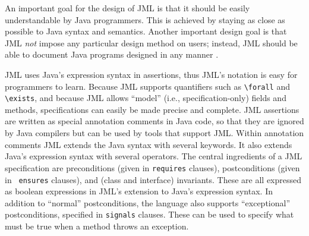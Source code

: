 An important goal for the design of JML is that it should be easily
understandable by Java programmers. This is achieved by staying as
close as possible to Java syntax and semantics.  Another important
design goal is that JML {\em not} impose any particular design method
on users; instead, JML should be able to document Java programs
designed in any manner \cite{Leavens-Baker-Ruby03}.

JML uses Java's expression syntax in assertions,
thus JML's notation is easy for programmers to learn.  
Because JML supports quantifiers such as
\verb_\forall_ and \verb_\exists_, and because JML allows ``model''
(i.e., specification-only) fields and methods, specifications can
easily be made precise and complete.
JML assertions are written as special
annotation comments in Java code,
so that they are ignored by Java compilers but can be used
by tools that support JML\@.  Within annotation comments JML extends the
Java syntax with several keywords.  It also extends Java's expression syntax with several
operators.
The central ingredients of a JML specification are preconditions
(given in {\tt requires} clauses), postconditions (given in {\tt
  ensures} clauses), and (class and interface) invariants.  These are
all expressed as boolean expressions in JML's extension to Java's
expression syntax.
In addition to ``normal'' postconditions, the language also supports
``exceptional'' postconditions, specified in {\tt signals} clauses.
These can be used to specify what must be true when a method throws an
exception. 
